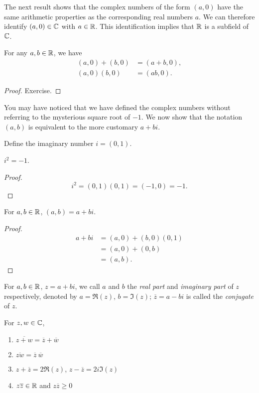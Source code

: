 The next result shows that the complex numbers of the form $(a,0)$ have the same arithmetic properties as the corresponding real numbers $a$. We can therefore identify $(a,0)\in\mathbb C$ with $a\in\mathbb R$. This identification implies that $\mathbb R$ is a subfield of $\mathbb C$.

\begin{proposition}
For any $a,b\in\mathbb R$, we have
\begin{align*}
(a,0)+(b,0)&=(a+b,0),\\
(a,0)(b,0)&=(ab,0).
\end{align*}
\end{proposition}

\begin{proof}
Exercise.
\end{proof}

You may have noticed that we have defined the complex numbers without referring to the mysterious square root of $-1$. We now show that the notation $(a,b)$ is equivalent to the more customary $a+bi$.

Define the imaginary number $i=(0,1)$.

\begin{proposition}
$i^2=-1$.
\end{proposition}

\begin{proof}
\[i^2=(0,1)(0,1)=(-1,0)=-1.\]
\end{proof}

\begin{proposition}
For $a,b\in\mathbb R$, $(a,b)=a+bi$.
\end{proposition}

\begin{proof}
\begin{align*}
a+bi&=(a,0)+(b,0)(0,1)\\
&=(a,0)+(0,b)\\
&=(a,b).
\end{align*}
\end{proof}

For $a,b\in\mathbb R$, $z=a+bi$, we call $a$ and $b$ the \emph{real part} and \emph{imaginary part} of $z$ respectively, denoted by $a=\Re(z)$, $b=\Im(z)$; $\overline{z}=a-bi$ is called the \emph{conjugate} of $z$.

\begin{proposition}
For $z,w\in\mathbb C$,
\begin{enumerate}[label=(\roman*)]
\item $\overline{z+w}=\overline{z}+\overline{w}$
\item $\overline{zw}=\overline{z}\:\overline{w}$
\item $z+\overline{z}=2\Re(z)$, $z-\overline{z}=2i\Im(z)$
\item $z\overline{z}\in\mathbb R$ and $z\overline{z}\ge0$
\end{enumerate}
\end{proposition}

